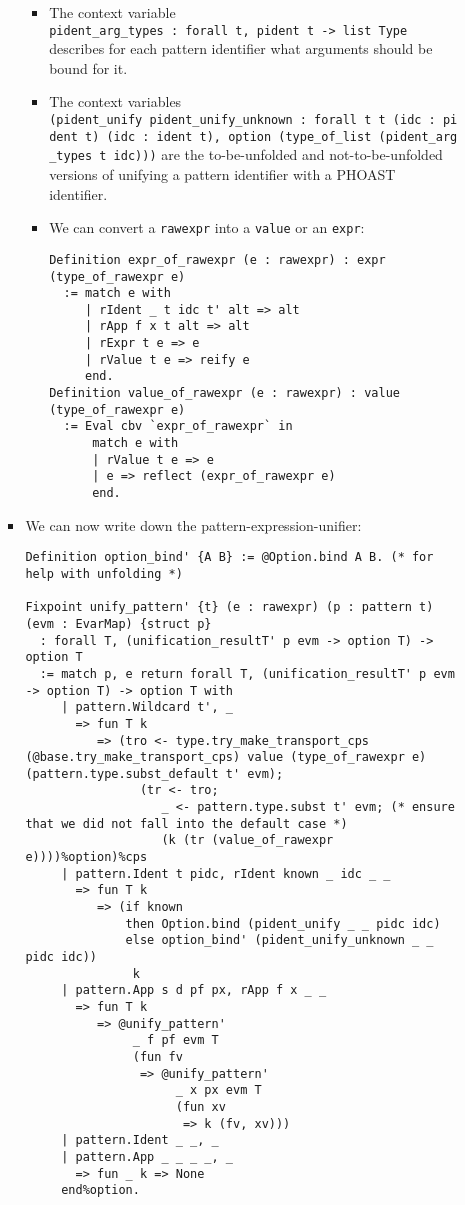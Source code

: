 \begin{itemize}
\begin{itemize}
\begin{itemize}
      \begin{itemize}
      \item
        The context variable
        \texttt{pident\_arg\_types\ :\ forall\ t,\ pident\ t\ -\textgreater{}\ list\ Type}
        describes for each pattern identifier what arguments should be
        bound for it.
      \item
        The context variables
        \texttt{(pident\_unify\ pident\_unify\_unknown\ :\ forall\ t\ t\textquotesingle{}\ (idc\ :\ pident\ t)\ (idc\textquotesingle{}\ :\ ident\ t\textquotesingle{}),\ option\ (type\_of\_list\ (pident\_arg\_types\ t\ idc)))}
        are the to-be-unfolded and not-to-be-unfolded versions of
        unifying a pattern identifier with a PHOAST identifier.
      \item
        We can convert a \texttt{rawexpr} into a \texttt{value} or an
        \texttt{expr}:

\begin{verbatim}
Definition expr_of_rawexpr (e : rawexpr) : expr (type_of_rawexpr e)
  := match e with
     | rIdent _ t idc t' alt => alt
     | rApp f x t alt => alt
     | rExpr t e => e
     | rValue t e => reify e
     end.
Definition value_of_rawexpr (e : rawexpr) : value (type_of_rawexpr e)
  := Eval cbv `expr_of_rawexpr` in
      match e with
      | rValue t e => e
      | e => reflect (expr_of_rawexpr e)
      end.
\end{verbatim}
      \end{itemize}
    \item
      We can now write down the pattern-expression-unifier:

\begin{verbatim}
Definition option_bind' {A B} := @Option.bind A B. (* for help with unfolding *)

Fixpoint unify_pattern' {t} (e : rawexpr) (p : pattern t) (evm : EvarMap) {struct p}
  : forall T, (unification_resultT' p evm -> option T) -> option T
  := match p, e return forall T, (unification_resultT' p evm -> option T) -> option T with
     | pattern.Wildcard t', _
       => fun T k
          => (tro <- type.try_make_transport_cps (@base.try_make_transport_cps) value (type_of_rawexpr e) (pattern.type.subst_default t' evm);
                (tr <- tro;
                   _ <- pattern.type.subst t' evm; (* ensure that we did not fall into the default case *)
                   (k (tr (value_of_rawexpr e))))%option)%cps
     | pattern.Ident t pidc, rIdent known _ idc _ _
       => fun T k
          => (if known
              then Option.bind (pident_unify _ _ pidc idc)
              else option_bind' (pident_unify_unknown _ _ pidc idc))
               k
     | pattern.App s d pf px, rApp f x _ _
       => fun T k
          => @unify_pattern'
               _ f pf evm T
               (fun fv
                => @unify_pattern'
                     _ x px evm T
                     (fun xv
                      => k (fv, xv)))
     | pattern.Ident _ _, _
     | pattern.App _ _ _ _, _
       => fun _ k => None
     end%option.
\end{verbatim}


\end{itemize}
\end{itemize}
\end{itemize}
